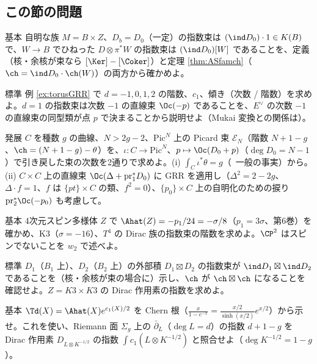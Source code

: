 \subsection*{この節の問題}
\begin{prob}{基本}\label{p:trivfam}
自明な族 $M=B\times Z$、$D_b=D_0$（一定）の指数束は $(\ind D_0)\cdot1\in K(B)$ で、$W\to B$ でひねった $D\otimes\pi^*W$ の指数束は $(\ind D_0)[W]$ であることを、定義（核・余核が束なら $[\Ker]-[\Coker]$）と定理 \ref{thm:ASfamch}（$\ch=\ind D_0\cdot\ch(W)$）の両方から確かめよ。
\end{prob}
\begin{prob}{標準}\label{p:FM}
例 \ref{ex:torusGRR} で $d=-1,0,1,2$ の階数、$c_1$、傾き（次数 / 階数）を求めよ。$d=1$ の指数束は次数 $-1$ の直線束 $\Oc(-p)$ であることを、$E^\vee$ の次数 $-1$ の直線束の同型類が点 $p$ で決まることから説明せよ（Mukai 変換との関係は\tQ）。
\end{prob}
\begin{prob}{発展}\label{p:AJdeg}
$C$ を種数 $g$ の曲線、$N>2g-2$、$\mathrm{Pic}^N$ 上の Picard 束 $\mathcal E_N$（階数 $N+1-g$、$\ch=(N+1-g)-\theta$）を、$\iota:C\to\mathrm{Pic}^N$、$p\mapsto\Oc(D_0+p)$（$\deg D_0=N-1$）で引き戻した束の次数を2通りで求めよ。(i) $\int_C\iota^*\theta=g$（\tC\ 一般の事実）から。(ii) $C\times C$ 上の直線束 $\Oc(\Delta+\mathrm{pr}_1^*D_0)$ に GRR を適用し（$\Delta^2=2-2g$、$\Delta\cdot f=1$、$f$ は $\{pt\}\times C$ の類、$f^2=0$）、$\{p_0\}\times C$ 上の自明化のための捩り $\mathrm{pr}_2^*\Oc(-p_0)$ も考慮して。
\end{prob}
\begin{prob}{基本}\label{p:AhatK3}
4次元スピン多様体 $Z$ で $\Ahat(Z)=-p_1/24=-\sigma/8$（$p_1=3\sigma$、第6巻）を確かめ、K3（$\sigma=-16$）、$T^4$ の Dirac 族の指数束の階数を求めよ。$\CP^2$ はスピンでないことを $w_2$ で述べよ。
\end{prob}
\begin{prob}{標準}\label{p:product}
$D_1$（$B_1$ 上）、$D_2$（$B_2$ 上）の外部積 $D_1\boxtimes D_2$ の指数束が $\ind D_1\boxtimes\ind D_2$ であることを（核・余核が束の場合に）示し、$\ch$ が $\ch\boxtimes\ch$ になることを確認せよ。$Z=K3\times K3$ の Dirac 作用素の指数を求めよ。
\end{prob}
\begin{prob}{基本}\label{p:Tdahat}
$\Td(X)=\Ahat(X)e^{c_1(X)/2}$ を Chern 根（$\frac x{1-e^{-x}}=\frac{x/2}{\sinh(x/2)}e^{x/2}$）から示せ。これを使い、Riemann 面 $\Sigma_g$ 上の $\bar\partial_L$（$\deg L=d$）の指数 $d+1-g$ を Dirac 作用素 $D_{L\otimes K^{-1/2}}$ の指数 $\int c_1(L\otimes K^{-1/2})$ と照合せよ（$\deg K^{-1/2}=1-g$）。
\end{prob}
